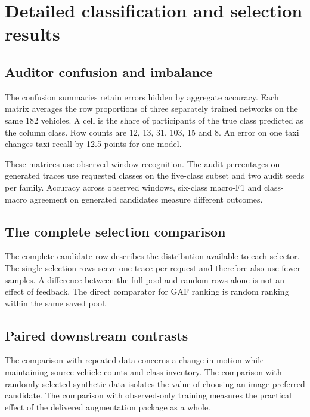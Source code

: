 \begingroup
\renewcommand{\tab}[3]{\begin{table}[H]\centering\caption{#1}\label{tab:#2}\small #3\end{table}}

\endgroup

\chapter{Detailed classification and selection results}
\label{app:classification}
\section{Auditor confusion and imbalance}
The confusion summaries retain errors hidden by aggregate accuracy. Each matrix averages the row proportions of three separately trained networks on the same 182 vehicles. A cell is the share of participants of the true class predicted as the column class. Row counts are 12, 13, 31, 103, 15 and 8. An error on one taxi changes taxi recall by 12.5 points for one model.


These matrices use observed-window recognition. The audit percentages on generated traces use requested classes on the five-class subset and two audit seeds per family. Accuracy across observed windows, six-class macro-F1 and class-macro agreement on generated candidates measure different outcomes.

\section{The complete selection comparison}

The complete-candidate row describes the distribution available to each selector. The single-selection rows serve one trace per request and therefore also use fewer samples. A difference between the full-pool and random rows alone is not an effect of feedback. The direct comparator for GAF ranking is random ranking within the same saved pool.

\section{Paired downstream contrasts}

The comparison with repeated data concerns a change in motion while maintaining source vehicle counts and class inventory. The comparison with randomly selected synthetic data isolates the value of choosing an image-preferred candidate. The comparison with observed-only training measures the practical effect of the delivered augmentation package as a whole.

